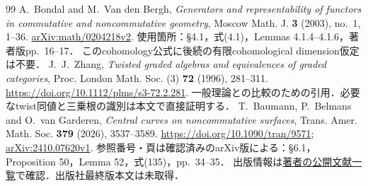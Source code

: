 \documentclass[11pt,a4paper]{ltjsarticle}
\begin{document}
\begin{thebibliography}{99}
 A.~Bondal and M.~Van den Bergh,
\emph{Generators and representability of functors in commutative and noncommutative geometry},
Moscow Math. J. \textbf{3} (2003), no.~1, 1--36.
\href{https://arxiv.org/abs/math/0204218v2}{arXiv:math/0204218v2}.
使用箇所：\S4.1，式(4.1)，Lemmas 4.1.4--4.1.6，著者版pp.~16--17．
このcohomology公式に後続の有限cohomological dimension仮定は不要．
 J.~J.~Zhang,
\emph{Twisted graded algebras and equivalences of graded categories},
Proc. London Math. Soc. (3) \textbf{72} (1996), 281--311.
\url{https://doi.org/10.1112/plms/s3-72.2.281}.
一般理論との比較のための引用．必要なtwist同値と三乗根の識別は本文で直接証明する．
 T.~Baumann, P.~Belmans and O.~van Garderen,
\emph{Central curves on noncommutative surfaces},
Trans. Amer. Math. Soc. \textbf{379} (2026), 3537--3589.
\url{https://doi.org/10.1090/tran/9571};
\href{https://arxiv.org/abs/2410.07620v1}{arXiv:2410.07620v1}.
参照番号・頁は確認済みのarXiv版による：\S6.1，Proposition 50，Lemma 52，式(135)，pp.~34--35．
出版情報は\href{https://pbelmans.ncag.info/writing/}{著者の公開文献一覧}で確認．出版社最終版本文は未取得．
\end{thebibliography}
\endgroup
\end{document}
